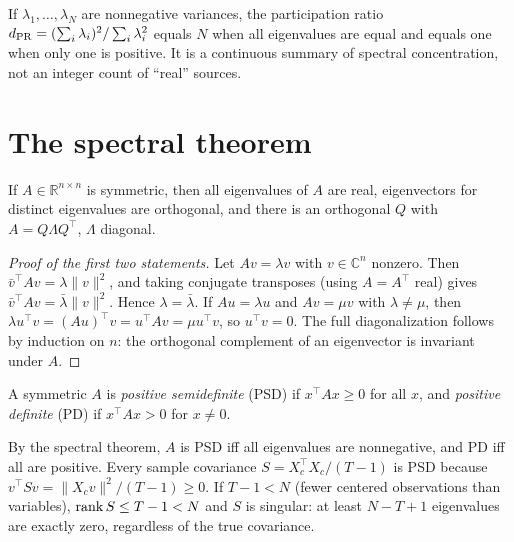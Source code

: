 \begin{workedexample}
If $\lambda_1,\ldots,\lambda_N$ are nonnegative variances, the participation ratio $d_{\rm PR}=(\sum_i\lambda_i)^2/\sum_i\lambda_i^2$ equals $N$ when all eigenvalues are equal and equals one when only one is positive. It is a continuous summary of spectral concentration, not an integer count of ``real'' sources.\end{workedexample}
\section{The spectral theorem}
\begin{theorem}
If $A\in\mathbb R^{n\times n}$ is symmetric, then all eigenvalues of $A$ are real, eigenvectors for distinct eigenvalues are orthogonal, and there is an orthogonal $Q$ with $A=Q\Lambda Q^\top$, $\Lambda$ diagonal.
\end{theorem}
\begin{proof}[Proof of the first two statements]
Let $Av=\lambda v$ with $v\in\mathbb C^n$ nonzero. Then $\bar v^\top Av=\lambda\|v\|^2$, and taking conjugate transposes (using $A=A^\top$ real) gives $\bar v^\top Av=\bar\lambda\|v\|^2$. Hence $\lambda=\bar\lambda$. If $Au=\lambda u$ and $Av=\mu v$ with $\lambda\ne\mu$, then $\lambda u^\top v=(Au)^\top v=u^\top Av=\mu u^\top v$, so $u^\top v=0$. The full diagonalization follows by induction on $n$: the orthogonal complement of an eigenvector is invariant under $A$.
\end{proof}

\begin{definition}
A symmetric $A$ is \emph{positive semidefinite} (PSD) if $x^\top Ax\ge0$ for all $x$, and \emph{positive definite} (PD) if $x^\top Ax>0$ for $x\ne0$.
\end{definition}
By the spectral theorem, $A$ is PSD iff all eigenvalues are nonnegative, and PD iff all are positive. Every sample covariance $S=X_c^\top X_c/(T-1)$ is PSD because $v^\top Sv=\|X_cv\|^2/(T-1)\ge0$. If $T-1<N$ (fewer centered observations than variables), $\operatorname{rank} S\le T-1<N$ and $S$ is singular: at least $N-T+1$ eigenvalues are exactly zero, regardless of the true covariance.

